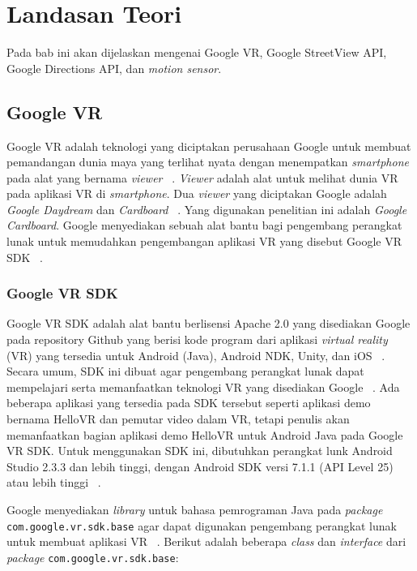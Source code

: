 \chapter{Landasan Teori}
\label{chap:teori}
Pada bab ini akan dijelaskan mengenai Google VR, Google StreetView API, Google Directions API, dan \textit{motion sensor}.

\section{Google VR}
\label{sec:google-vr} 
Google VR adalah teknologi yang diciptakan perusahaan Google untuk membuat pemandangan dunia maya yang terlihat nyata dengan menempatkan \textit{smartphone} pada alat yang bernama \textit{viewer} ~\cite{quickstart-google-vr}. \textit{Viewer} adalah alat untuk melihat dunia VR pada aplikasi VR di \textit{smartphone}. Dua \textit{viewer} yang diciptakan Google adalah \textit{Google Daydream} dan \textit{Cardboard} ~\cite{quickstart-google-vr}. Yang digunakan penelitian ini adalah \textit{Google Cardboard}. Google menyediakan sebuah alat bantu bagi pengembang perangkat lunak untuk memudahkan pengembangan aplikasi VR yang disebut Google VR SDK ~\cite{quickstart-google-vr}.

\subsection{Google VR SDK}
Google VR SDK adalah alat bantu berlisensi Apache 2.0 yang disediakan Google pada repository Github yang berisi kode program dari aplikasi {\it virtual reality} (VR)  yang tersedia untuk Android (Java), Android NDK, Unity, dan iOS ~\cite{all-google-vr}. Secara umum, SDK ini dibuat agar pengembang perangkat lunak dapat mempelajari serta memanfaatkan teknologi VR yang disediakan Google ~\cite{quickstart-google-vr}. Ada beberapa aplikasi yang tersedia pada SDK tersebut seperti aplikasi demo bernama HelloVR dan pemutar video dalam VR, tetapi penulis akan memanfaatkan bagian aplikasi demo HelloVR untuk Android Java pada Google VR SDK. Untuk menggunakan SDK ini, dibutuhkan perangkat lunk Android Studio 2.3.3 dan lebih tinggi, dengan Android SDK versi 7.1.1 (API Level 25) atau lebih tinggi ~\cite{quickstart-google-vr}. 

Google menyediakan \textit{library} untuk bahasa pemrograman Java pada \textit{package} \texttt{com.google.vr.sdk.base} agar dapat digunakan pengembang perangkat lunak untuk membuat aplikasi VR ~\cite{google-vr-sdk}. Berikut adalah beberapa \textit{class} dan \textit{interface} dari \textit{package} \texttt{com.google.vr.sdk.base}:

